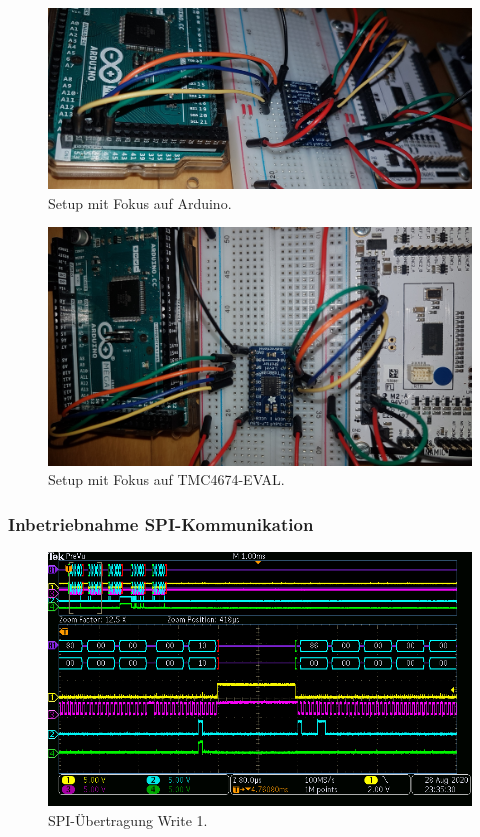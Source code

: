 \begin{appendix}
\begin{figure}[h!]
	\centering
	\includegraphics[width=\textwidth]{graphics/1_Arduino}
	\caption{Setup mit Fokus auf Arduino.}
	\label{fig:1_Arduino}
\end{figure}

\newpage

\begin{figure}[h!]
	\centering
	\includegraphics[angle=180,width=\textwidth]{graphics/1_EVAL}
	\caption{Setup mit Fokus auf TMC4674-EVAL.}
	\label{fig:1_EVAL}
\end{figure}

\subsubsection{Inbetriebnahme SPI-Kommunikation}\label{Appendix:TMC6200_SPI}

\begin{figure}[h!]
\center
\includegraphics[width = \textwidth]{graphics/TMC6200_Beschreiben2}
\caption{SPI-Übertragung Write 1.}
\label{fig:TMC6200_Beschreiben2}
\end{figure}


\end{appendix}
